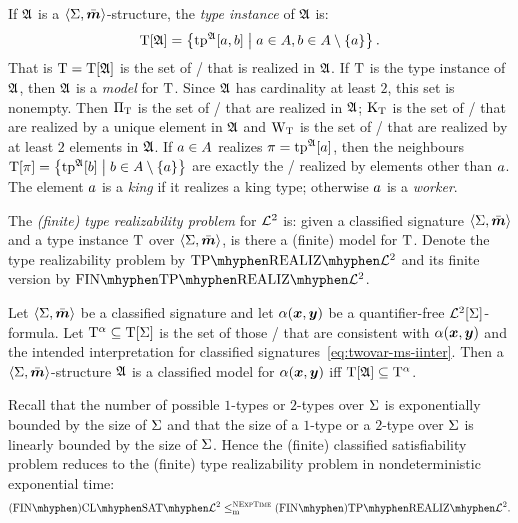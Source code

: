 If $\mathfrak{A}$ is a $\left\langle \mathrm{\Sigma},\bar{\bm{m}} \right\rangle$-structure, the \emph{type instance} of $\mathfrak{A}$
is:
\[
  \mathrm{T}[\mathfrak{A}] = \left\{\operatorname{tp}^{\mathfrak{A}}[a,b]\mathrel{}\middle|\mathrel{}
    a \in A, b \in A \setminus\left\{a\right\}\right\}.
\]
That is $\mathrm{T} = \mathrm{T}[\mathfrak{A}]$ is the set of \twotypes/ that is realized in $\mathfrak{A}$.
If $\mathrm{T}$ is the type instance of $\mathfrak{A}$, then $\mathfrak{A}$ is a \emph{model} for
$\mathrm{T}$.
Since $\mathfrak{A}$ has cardinality at least $2$, this set is nonempty.
Then ${\Pi}_{\mathrm{T}}$ is the set of \onetypes/ that are realized in $\mathfrak{A}$;
${\mathrm{K}}_{\mathrm{T}}$ is the set of \onetypes/ that are realized by a unique element in
$\mathfrak{A}$ and ${\mathrm{W}}_{\mathrm{T}}$ is the set of \onetypes/ that are realized by at least $2$
elements in $\mathfrak{A}$.
If $a \in A$ realizes $\pi=\operatorname{tp}^{\mathfrak{A}}[a]$, then the neighbours
$\mathrm{T}[\pi] = \left\{\operatorname{tp}^{\mathfrak{A}}[b]\mathrel{}\middle|\mathrel{}b \in A \setminus \left\{a\right\}\right\}$ are exactly the
\onetypes/ realized by elements other than $a$.
The element $a$ is a \emph{king} if it realizes a king type; otherwise $a$
is a \emph{worker}.

\begin{definition}
The \emph{(finite) type realizability problem} for $\mathcal{L}^{2}$ is: given a
classified signature $\left\langle \mathrm{\Sigma},\bar{\bm{m}} \right\rangle$ and a type instance $\mathrm{T}$ over
$\left\langle \mathrm{\Sigma},\bar{\bm{m}} \right\rangle$, is there a (finite) model for $\mathrm{T}$.
Denote the type realizability problem by $\Real{\vFo2}$ and its finite version
by $\FinReal{\vFo2}$.
\end{definition}

\begin{remark}\label{rem:red-sat-to-real}
Let $\left\langle \mathrm{\Sigma},\bar{\bm{m}} \right\rangle$ be a classified signature and let $\alpha(\bm{x},\bm{y})$ be a
quantifier-free $\mathcal{L}^{2}[\mathrm{\Sigma}]$-formula.
Let $\mathrm{T}^\alpha \subseteq \mathrm{T}[\mathrm{\Sigma}]$ is the set of those \twotypes/ that are
consistent with $\alpha(\bm{x},\bm{y})$ and the intended interpretation
for classified signatures~\cref{eq:twovar-ms-iinter}.
Then a $\left\langle \mathrm{\Sigma},\bar{\bm{m}} \right\rangle$-structure $\mathfrak{A}$ is a classified model for
$\alpha(\bm{x},\bm{y})$ iff $\mathrm{T}[\mathfrak{A}] \subseteq \mathrm{T}^\alpha$.

Recall that the number of possible $1$-types or $2$-types over $\mathrm{\Sigma}$ is
exponentially bounded by the size of $\mathrm{\Sigma}$ and that the size of a $1$-type or
a $2$-type over $\mathrm{\Sigma}$ is linearly bounded by the size of $\mathrm{\Sigma}$.
Hence the (finite) classified satisfiability problem reduces to the
(finite) type realizability problem in nondeterministic exponential time:
\[
  \FinAClSat{\vFo2} \red\cNExpTime \FinAReal{\vFo2}.
\]
\end{remark}

